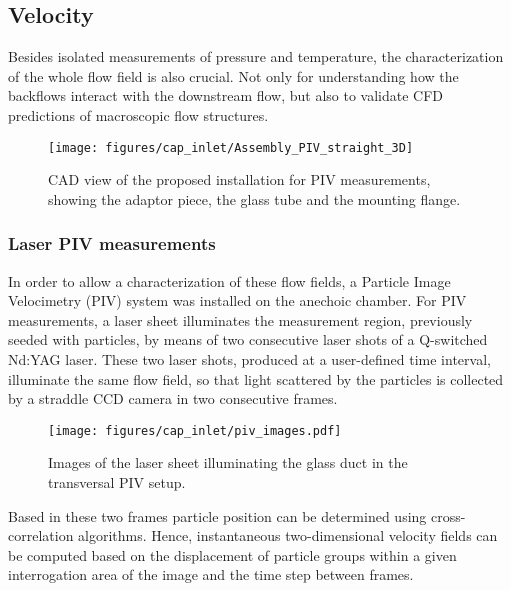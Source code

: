 \subsection{Velocity}

Besides isolated measurements of pressure and temperature, the characterization of the whole flow field is also crucial. Not only for understanding how the backflows interact with the downstream flow, but also to validate CFD predictions of macroscopic flow structures.

\begin{figure}[htb!]
\centering
\texttt{[image: figures/cap\_inlet/Assembly\_PIV\_straight\_3D]}
\caption[CAD view of the installation for PIV measurements]{CAD view of the proposed installation for PIV measurements, showing the adaptor piece, the glass tube and the mounting flange.}
\label{fig:assembly_piv}
\end{figure}

\subsubsection{Laser PIV measurements}\label{sub:setup_piv}

In order to allow a characterization of these flow fields, a Particle Image Velocimetry (PIV) system was installed on the anechoic chamber. For PIV measurements, a laser sheet illuminates the measurement region, previously seeded with particles, by means of two consecutive laser shots of a Q-switched Nd:YAG laser. These two laser shots, produced at a user-defined time interval, illuminate the same flow field, so that light scattered by the particles is collected by a straddle CCD camera in two consecutive frames.

\begin{wrapfigure}{I}[0.5cm]{0.4\textwidth}
\centering
\null\vspace{0mm}
\texttt{[image: figures/cap\_inlet/piv\_images.pdf]}
\caption[Images of the laser sheet for PIV]{Images of the laser sheet illuminating the glass duct in the transversal PIV setup.}
\label{fig:piv_transv_photo}
\end{wrapfigure}

Based in these two frames particle position can be determined using cross-correlation algorithms. Hence, instantaneous two-dimensional velocity fields can be computed based on the displacement of particle groups within a given interrogation area of the image and the time step between frames.

